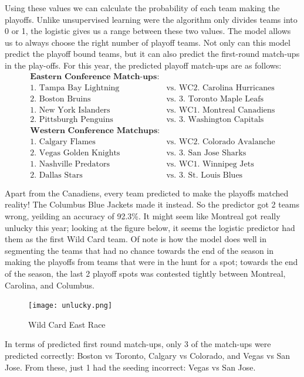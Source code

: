 \documentclass[10pt,letterpaper]{article}
\begin{document}
Using these values we can calculate the probability of each team making the playoffs. Unlike unsupervised learning were the algorithm only divides teams into 0 or 1, the logistic gives us a range between these two values. The model allows us to always choose the right number of playoff teams. Not only can this model predict the playoff bound teams, but it can also predict the first-round match-ups in the play-offs. For this year, the predicted playoff match-ups are as follows:
\begin{align*}
    \textbf{Eastern Conference Match-ups:}\\
    \text{1. Tampa Bay Lightning } &\text{vs. } \text{WC2. Carolina Hurricanes}\\
    \text{2. Boston Bruins } &\text{vs. } \text{3. Toronto Maple Leafs}\\
    \text{1. New York Islanders } &\text{vs. } \text{WC1. Montreal Canadiens}\\
    \text{2. Pittsburgh Penguins } &\text{vs. } \text{3. Washington Capitals}\\
    \textbf{Western Conference Matchups:}\\
    \text{1. Calgary Flames } &\text{vs. } \text{WC2. Colorado Avalanche}\\
    \text{2. Vegas Golden Knights } &\text{vs. } \text{3. San Jose Sharks}\\
    \text{1. Nashville Predators } &\text{vs. } \text{WC1. Winnipeg Jets}\\
    \text{2. Dallas Stars } &\text{vs. } \text{3. St. Louis Blues}
\end{align*}


Apart from the Canadiens, every team predicted to make the playoffs matched reality! The Columbus Blue Jackets made it instead. So the predictor got 2 teams wrong, yeilding an accuracy of 92.3\%. It might seem like Montreal got really unlucky this year; looking at the figure below, it seems the logistic predictor had them as the first Wild Card team. Of note is how the model does well in segmenting the teams that had no chance towards the end of the season in making the playoffs from teams that were in the hunt for a spot; towards the end of the season, the last 2 playoff spots was contested tightly between Montreal, Carolina, and Columbus.
\begin{figure}[H]
    \centering
    \texttt{[image: unlucky.png]}
    \caption{Wild Card East Race}
    \label{fig:WCE}
\end{figure}
In terms of predicted first round match-ups, only 3 of the match-ups were predicted correctly: Boston vs Toronto, Calgary vs Colorado, and Vegas vs San Jose. From these, just 1 had the seeding incorrect: Vegas vs San Jose. 
\end{document}
